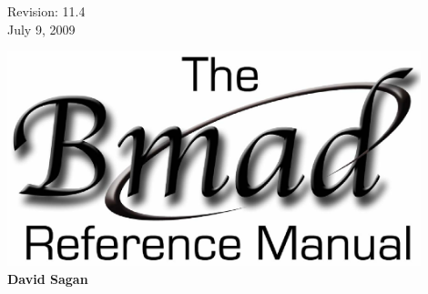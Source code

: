 \thispagestyle{empty}

\begin{flushright}
\large
  Revision: 11.4 \\
  July 9, 2009 \\
\end{flushright}

\vfill

{
\begin{center}
\includegraphics[width=12cm]{bmad-ref-manual.eps} \\
\vskip 0.3in
\huge\bf David Sagan
\end{center}
}

\vfill
\break

